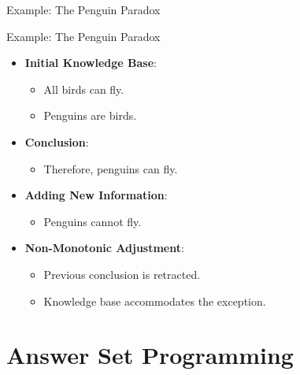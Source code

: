 \begin{frame}{Example: The Penguin Paradox}
    \begin{exampleblock}{Example: The Penguin Paradox}
        \begin{itemize}
            \item \textbf{Initial Knowledge Base}:
                  \begin{itemize}
                      \item All birds can fly.
                      \item Penguins are birds.
                  \end{itemize}
            \item \textbf{Conclusion}:
                  \begin{itemize}
                      \item Therefore, penguins can fly.
                  \end{itemize}
            \item \textbf{Adding New Information}:
                  \begin{itemize}
                      \item Penguins cannot fly.
                  \end{itemize}
            \item \textbf{Non-Monotonic Adjustment}:
                  \begin{itemize}
                      \item Previous conclusion is retracted.
                      \item Knowledge base accommodates the exception.
                  \end{itemize}
        \end{itemize}
    \end{exampleblock}
\end{frame}

\section{Answer Set Programming}

